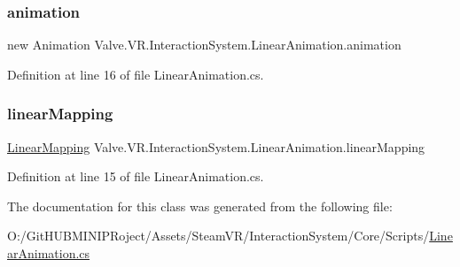 \subsubsection{\texorpdfstring{animation}{animation}}
{\footnotesize\ttfamily new Animation Valve.\+V\+R.\+Interaction\+System.\+Linear\+Animation.\+animation}



Definition at line 16 of file Linear\+Animation.\+cs.

\mbox{\label{class_valve_1_1_v_r_1_1_interaction_system_1_1_linear_animation_ac3554c09dd78ca72b877714509e6296c}} 
\subsubsection{\texorpdfstring{linearMapping}{linearMapping}}
{\footnotesize\ttfamily \mbox{\hyperlink{class_valve_1_1_v_r_1_1_interaction_system_1_1_linear_mapping}{Linear\+Mapping}} Valve.\+V\+R.\+Interaction\+System.\+Linear\+Animation.\+linear\+Mapping}



Definition at line 15 of file Linear\+Animation.\+cs.



The documentation for this class was generated from the following file\+:\begin{DoxyCompactItemize}
\item 
O\+:/\+Git\+H\+U\+B\+M\+I\+N\+I\+P\+Roject/\+Assets/\+Steam\+V\+R/\+Interaction\+System/\+Core/\+Scripts/\mbox{\hyperlink{_linear_animation_8cs}{Linear\+Animation.\+cs}}\end{DoxyCompactItemize}
